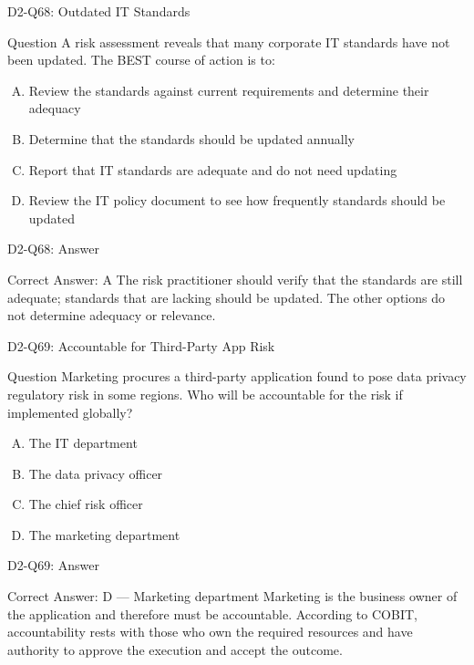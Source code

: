 \documentclass{beamer}
\begin{document}
	\begin{frame}{D2-Q68: Outdated IT Standards}
		\begin{block}{Question}
			A risk assessment reveals that many corporate IT standards have not been updated. The BEST course of action is to:
		\end{block}
		\begin{enumerate}[(A)]
			\item Review the standards against current requirements and determine their adequacy
			\item Determine that the standards should be updated annually
			\item Report that IT standards are adequate and do not need updating
			\item Review the IT policy document to see how frequently standards should be updated
		\end{enumerate}
	\end{frame}
	\begin{frame}{D2-Q68: Answer}
		\begin{block}{Correct Answer: A}
			The risk practitioner should verify that the standards are still adequate; standards that are lacking should be updated. The other options do not determine adequacy or relevance.
		\end{block}
	\end{frame}
	
	\begin{frame}{D2-Q69: Accountable for Third-Party App Risk}
		\begin{block}{Question}
			Marketing procures a third-party application found to pose data privacy regulatory risk in some regions. Who will be accountable for the risk if implemented globally?
		\end{block}
		\begin{enumerate}[(A)]
			\item The IT department
			\item The data privacy officer
			\item The chief risk officer
			\item The marketing department
		\end{enumerate}
	\end{frame}
	\begin{frame}{D2-Q69: Answer}
		\begin{block}{Correct Answer: D --- Marketing department}
			Marketing is the business owner of the application and therefore must be accountable. According to COBIT, accountability rests with those who own the required resources and have authority to approve the execution and accept the outcome.
		\end{block}
	\end{frame}
	
\end{document}
